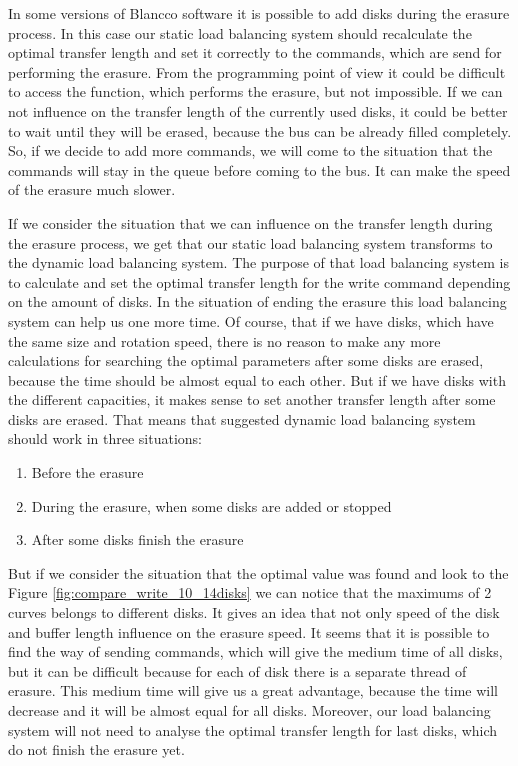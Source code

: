 In some versions of Blancco software it is possible to add disks during the erasure process. In this case our static load balancing system should recalculate the optimal transfer length and set it correctly to the commands, which are send for performing the erasure. From the programming point of view it could be difficult to access the function, which performs the erasure, but not impossible. If we can not influence on the transfer length of the currently used disks, it could be better to wait until they will be erased, because the bus can be already filled completely. So, if we decide to add more commands, we will come to the situation that the commands will stay in the queue before coming to the bus. It can make the speed of the erasure much slower.

If we consider the situation that we can influence on the transfer length during the erasure process, we get that our static load balancing system transforms to the dynamic load balancing system. The purpose of that load balancing system is to calculate and set the optimal transfer length for the write command depending on the amount of disks. In the situation of ending the erasure this load balancing system can help us one more time. Of course, that if we have disks, which have the same size and rotation speed, there is no reason to make any more calculations for searching the optimal parameters after some disks are erased, because the time should be almost equal to each other. But if we have disks with the different capacities, it makes sense to set another transfer length after some disks are erased. That means that suggested dynamic load balancing system should work in three situations:
\begin{enumerate}
	\setlength{\itemsep}{-2mm}
	\item Before the erasure
	\item During the erasure, when some disks are added or stopped
	\item After some disks finish the erasure
\end{enumerate}

But if we consider the situation that the optimal value was found and look to the Figure \ref{fig:compare_write_10_14disks} we can notice that the maximums of 2 curves belongs to different disks. It gives an idea that not only speed of the disk and buffer length influence on the erasure speed. It seems that it is possible to find the way of sending commands, which will give the medium time of all disks, but it can be difficult because for each of disk there is a separate thread of erasure. This medium time will give us a great advantage, because the time will decrease and it will be almost equal for all disks. Moreover, our load balancing system will not need to analyse the optimal transfer length for last disks, which do not finish the erasure yet.


